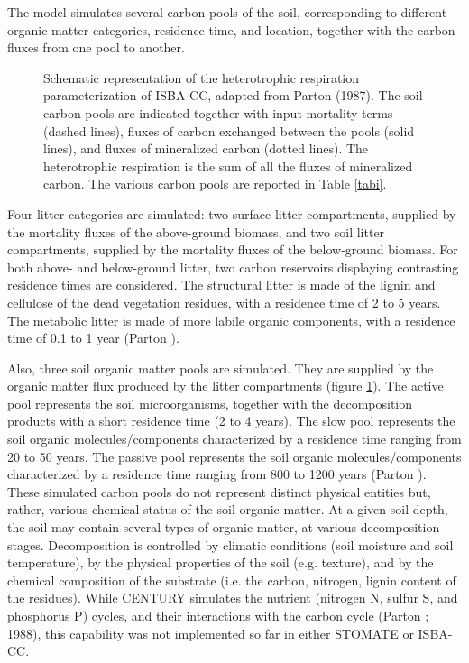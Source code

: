 {The model simulates several carbon pools of the soil, corresponding 
to different organic matter categories, residence time, and location, 
together with the carbon fluxes from one pool to another.

\begin{figure}[h]
\begin{center}
\caption{Schematic representation of the heterotrophic respiration parameterization of ISBA-CC, 
adapted from Parton \etal (1987). The soil carbon pools are indicated together with input mortality 
terms (dashed lines), fluxes of carbon exchanged between the pools (solid lines), 
and fluxes of mineralized carbon (dotted lines). The heterotrophic respiration is the sum of
all the fluxes of mineralized carbon. The various carbon pools are reported in Table \ref{tabi}.}
\label{fig_soil}
\end{center}
\end{figure}


Four litter categories are simulated: two surface litter compartments, 
supplied by the mortality fluxes of the above-ground biomass, 
and two soil litter compartments, supplied by the mortality fluxes of the below-ground biomass.
For both above- and below-ground litter, two carbon reservoirs displaying contrasting residence 
times are considered. 
The structural litter is made of the lignin and cellulose of the dead vegetation residues, with 
a residence time of 2 to 5 years. 
The metabolic litter is made of more labile organic components, with 
a residence time of 0.1 to 1 year (Parton ). 

Also, three soil organic matter pools are simulated. They are supplied 
by the organic matter flux produced by the litter compartments (figure \ref{fig_soil}). 
The active pool represents the soil microorganisms, 
together with the decomposition products with a short residence time (2 to 4 years). 
The slow pool represents the soil organic molecules/components characterized by a residence time 
ranging from 20 to 50 years. 
The passive pool represents the soil organic molecules/components characterized by a residence time 
ranging from 800 to 1200 years (Parton ). 
These simulated carbon pools do not represent distinct physical entities but, rather, 
various chemical status of the soil organic matter. 
At a given soil depth, the soil may contain several types of organic matter, 
at various decomposition stages. 
Decomposition is controlled by climatic conditions (soil moisture and soil temperature), 
by the physical properties of the soil (e.g. texture), and by the chemical composition 
of the substrate (i.e. the carbon, nitrogen, lignin content of the residues). 
While CENTURY simulates the nutrient (nitrogen N, sulfur S, and phosphorus P) cycles, 
and their interactions with the carbon cycle (Parton ; 1988), this capability  
was not implemented so far in either STOMATE or ISBA-CC.


}

